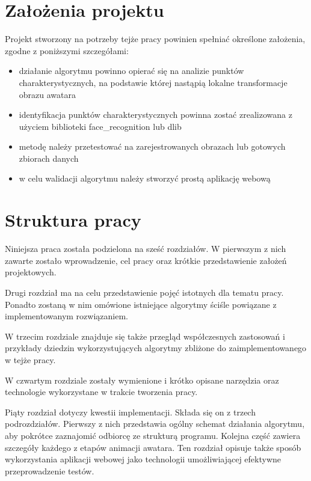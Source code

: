 
\section{Założenia projektu}
\label{sec:zalozeniaProjektu}
Projekt stworzony na potrzeby tejże pracy powinien spełniać określone założenia, zgodne z poniższymi szczegółami:
\begin{itemize}
    \item działanie algorytmu powinno opierać się na analizie punktów charakterystycznych, na podstawie której nastąpią lokalne transformacje obrazu awatara
    \item identyfikacja punktów charakterystycznych powinna zostać zrealizowana z użyciem biblioteki face\_recognition lub dlib
    \item metodę należy przetestować na zarejestrowanych obrazach lub gotowych zbiorach danych
    \item w celu walidacji algorytmu należy stworzyć prostą aplikację webową
\end{itemize}


\section{Struktura pracy}
\label{sec:strukturaPracy}
Niniejsza praca została podzielona na sześć rozdziałów. W pierwszym z nich zawarte zostało wprowadzenie, cel pracy oraz krótkie przedstawienie założeń projektowych.

Drugi rozdział ma na celu przedstawienie pojęć istotnych dla tematu pracy. Ponadto zostaną w nim omówione istniejące algorytmy ściśle powiązane z implementowanym rozwiązaniem. 

W trzecim rozdziale znajduje się także przegląd współczesnych zastosowań i przykłady dziedzin wykorzystujących algorytmy zbliżone do zaimplementowanego w tejże pracy. 

W czwartym rozdziale zostały wymienione i krótko opisane narzędzia oraz technologie wykorzystane w trakcie tworzenia pracy.

Piąty rozdział dotyczy kwestii implementacji. Składa się on z trzech podrozdziałów. Pierwszy z nich przedstawia ogólny schemat działania algorytmu, aby pokrótce zaznajomić odbiorcę ze strukturą programu. Kolejna część zawiera szczegóły każdego z etapów animacji awatara. Ten rozdział opisuje także sposób wykorzystania aplikacji webowej jako technologii umożliwiającej efektywne przeprowadzenie testów.

